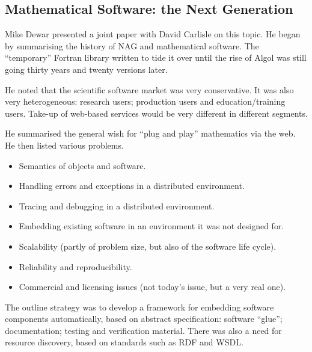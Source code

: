 \documentclass[11pt, a4paper]{article}
\begin{document}
\subsection{Mathematical Software: the Next Generation}
Mike Dewar presented a joint paper with David Carlisle on this topic. He
began by summarising the history of NAG and mathematical software. The
``temporary'' Fortran library written to tide it over until the rise of
Algol was still going thirty years and twenty versions later.
\par
He noted that the scientific software market was very conservative. It was
also very heterogeneous: research users; production users and
education/training users. Take-up of web-based services would be very
different in different segments.
\par
He summarised the general wish for ``plug and play'' mathematics via the web.
He then listed various problems.
\begin{itemize}
\item Semantics of objects and software.
\item Handling errors and exceptions in a distributed environment.
\item Tracing and debugging in a distributed environment.
\item Embedding existing software in an environment it was not designed
for.
\item Scalability (partly of problem size, but also of the software life
cycle).
\item Reliability and reproducibility.
\item Commercial and licensing issues (not today's issue, but a very real
one).
\end{itemize}
The outline strategy was to develop  a framework for embedding software
components automatically, based on abstract specification: software
``glue''; documentation; testing and verification material. There was also
a need for resource discovery, based on standards such as RDF and WSDL.
\end{document}

